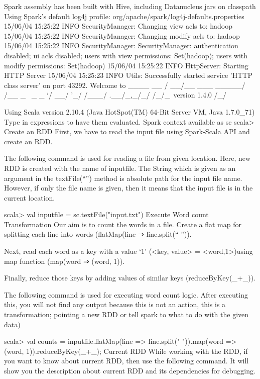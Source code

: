 Spark assembly has been built with Hive, including Datanucleus jars on classpath 
Using Spark's default log4j profile: org/apache/spark/log4j-defaults.properties 
15/06/04 15:25:22 INFO SecurityManager: Changing view acls to: hadoop 
15/06/04 15:25:22 INFO SecurityManager: Changing modify acls to: hadoop 
15/06/04 15:25:22 INFO SecurityManager: SecurityManager: authentication disabled;
   ui acls disabled; users with view permissions: Set(hadoop); users with modify permissions: Set(hadoop) 
15/06/04 15:25:22 INFO HttpServer: Starting HTTP Server 
15/06/04 15:25:23 INFO Utils: Successfully started service 'HTTP class server' on port 43292. 
Welcome to 
      ____              __ 
     / __/__  ___ _____/ /__ 
    _\ \/ _ \/ _ `/ __/  '_/ 
   /___/ .__/\_,_/_/ /_/\_\   version 1.4.0 
      /_/  
		
Using Scala version 2.10.4 (Java HotSpot(TM) 64-Bit Server VM, Java 1.7.0_71) 
Type in expressions to have them evaluated. 
Spark context available as sc 
scala>
Create an RDD
First, we have to read the input file using Spark-Scala API and create an RDD.

The following command is used for reading a file from given location. Here, new RDD is created with the name of inputfile. The String which is given as an argument in the textFile(“”) method is absolute path for the input file name. However, if only the file name is given, then it means that the input file is in the current location.

scala> val inputfile = sc.textFile("input.txt")
Execute Word count Transformation
Our aim is to count the words in a file. Create a flat map for splitting each line into words (flatMap(line ⇒ line.split(“ ”)).

Next, read each word as a key with a value ‘1’ (<key, value> = <word,1>)using map function (map(word ⇒ (word, 1)).

Finally, reduce those keys by adding values of similar keys (reduceByKey(_+_)).

The following command is used for executing word count logic. After executing this, you will not find any output because this is not an action, this is a transformation; pointing a new RDD or tell spark to what to do with the given data)

scala> val counts = inputfile.flatMap(line => line.split(" ")).map(word => (word, 1)).reduceByKey(_+_);
Current RDD
While working with the RDD, if you want to know about current RDD, then use the following command. It will show you the description about current RDD and its dependencies for debugging.

